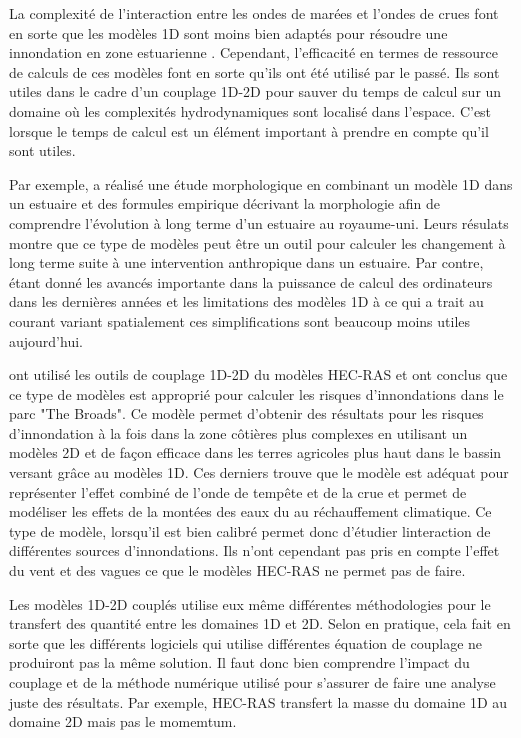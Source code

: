 \documentclass[12pt]{article}   %
\begin{document}
    La complexité de l'interaction entre les ondes de marées et l'ondes de crues font en sorte que les modèles 1D sont moins bien adaptés pour résoudre une innondation en zone estuarienne \cite{Teng2017}. Cependant, l'efficacité en termes de ressource de calculs de ces modèles font en sorte qu'ils ont été utilisé par le passé. Ils sont utiles dans le cadre d'un couplage 1D-2D pour sauver du temps de calcul sur un domaine où les complexités hydrodynamiques sont localisé dans l'espace. C'est lorsque le temps de calcul est un élément important à prendre en compte qu'il sont utiles.
    
    Par exemple, \cite{Spearman1998} a réalisé une étude morphologique en combinant un modèle 1D dans un estuaire et des formules empirique décrivant la morphologie afin de comprendre l'évolution à long terme d'un estuaire au royaume-uni. Leurs résulats montre que ce type de modèles peut être un outil pour calculer les changement à long terme suite à une intervention anthropique dans un estuaire. Par contre, étant donné les avancés importante dans la puissance de calcul des ordinateurs dans les dernières années et les limitations des modèles 1D à ce qui a trait au courant variant spatialement ces simplifications sont beaucoup moins utiles aujourd'hui.
    
    \cite{Pasquier2019} ont utilisé les outils de couplage 1D-2D du modèles HEC-RAS et ont conclus que ce type de modèles est approprié pour calculer les risques d'innondations dans le parc "The Broads". Ce modèle permet d'obtenir des résultats pour les risques d'innondation à la fois dans la zone côtières plus complexes en utilisant un modèles 2D et de façon efficace dans les terres agricoles plus haut dans le bassin versant grâce au modèles 1D. Ces derniers trouve que le modèle est adéquat pour représenter l'effet combiné de l'onde de tempête et de la crue et permet de modéliser les effets de la montées des eaux du au réchauffement climatique. Ce type de modèle, lorsqu'il est bien calibré permet donc d'étudier linteraction de différentes sources d'innondations. Ils n'ont cependant pas pris en compte l'effet du vent et des vagues ce que le modèles HEC-RAS ne permet pas de faire.
    
    Les modèles 1D-2D couplés utilise eux même différentes méthodologies pour le transfert des quantité entre les domaines 1D et 2D. Selon \cite{Neelz2013} en pratique, cela fait en sorte que les différents logiciels qui utilise différentes équation de couplage ne produiront pas la même solution. Il faut donc bien comprendre l'impact du couplage et de la méthode numérique utilisé pour s'assurer de faire une analyse juste des résultats. Par exemple, HEC-RAS transfert la masse du domaine 1D au domaine 2D mais pas le momemtum.
    
\end{document}
